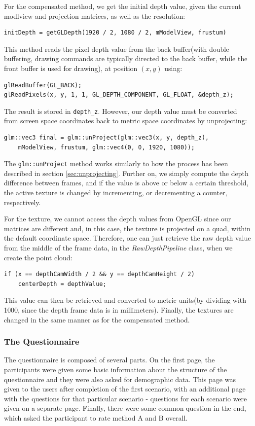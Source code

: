 \documentclass[]{article}
\begin{document}
For the compensated method, we get the initial depth value, given the current modlview and projection matrices, as well as the resolution:
\begin{verbatim}
initDepth = getGLDepth(1920 / 2, 1080 / 2, mModelView, frustum)
\end{verbatim}
This method reads the pixel depth value from the back buffer(with double buffering, drawing commands are typically directed to the back buffer, while the front buffer is used for drawing), at position $(x,y)$ using:
\begin{verbatim}
glReadBuffer(GL_BACK);
glReadPixels(x, y, 1, 1, GL_DEPTH_COMPONENT, GL_FLOAT, &depth_z);
\end{verbatim}
The result is stored in \verb|depth_z|. However, our depth value must be converted from screen space coordinates back to metric space coordinates by unprojecting:
\begin{verbatim}
glm::vec3 final = glm::unProject(glm::vec3(x, y, depth_z),
    mModelView, frustum, glm::vec4(0, 0, 1920, 1080));
\end{verbatim}
The \verb|glm::unProject| method works similarly to how the process has been described in section \ref{sec:unprojecting}. Further on, we simply compute the depth difference between frames, and if the value is above or below a certain threshold, the active texture is changed by incrementing, or decrementing a counter, respectively.

For the texture, we cannot access the depth values from OpenGL since our matrices are different and, in this case, the texture is projected on a quad, within the default coordinate space. Therefore, one can just retrieve the raw depth value from the middle of the frame data, in the \textit{RawDepthPipeline} class, when we create the point cloud:
\begin{verbatim}
if (x == depthCamWidth / 2 && y == depthCamHeight / 2)
	centerDepth = depthValue;
\end{verbatim}
This value can then be retrieved and converted to metric units(by dividing with 1000, since the depth frame data is in millimeters). Finally, the textures are changed in the same manner as for the compensated method.

\subsubsection{The Questionnaire}

The questionnaire is composed of several parts. On the first page, the participants were given some basic information about the structure of the questionnaire and they were also asked for demographic data. This page was given to the users after completion of the first scenario, with an additional page with the questions for that particular scenario - questions for each scenario were given on a separate page. Finally, there were some common question in the end, which asked the participant to rate method A and B overall.
\end{document}
